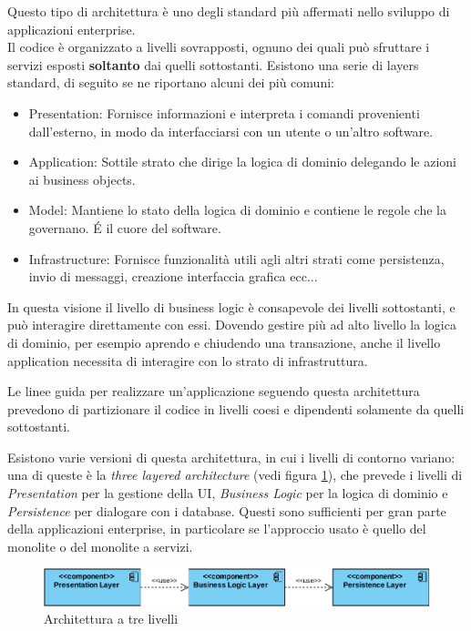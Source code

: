 Questo tipo di architettura è uno degli standard più affermati nello sviluppo di applicazioni enterprise.\\
Il codice è organizzato a livelli sovrapposti, ognuno dei quali può sfruttare i servizi esposti \textbf{soltanto} dai quelli sottostanti.
Esistono una serie di layers standard, di seguito se ne riportano alcuni dei più comuni\cite{ddd}:
\begin{itemize}
	\item Presentation: Fornisce informazioni e interpreta i comandi provenienti dall'esterno, in modo da interfacciarsi con un utente o un'altro software.
	\item Application: Sottile strato che dirige la logica di dominio delegando le azioni ai business objects.
	\item Model: Mantiene lo stato della logica di dominio e contiene le regole che la governano. \'E il cuore del software.
	\item Infrastructure: Fornisce funzionalità utili agli altri strati come persistenza, invio di messaggi, creazione interfaccia grafica ecc...
\end{itemize}
In questa visione il livello di business logic è consapevole dei livelli sottostanti, e può interagire direttamente con essi.
Dovendo gestire più ad alto livello la logica di dominio, per esempio aprendo e chiudendo una transazione, anche il livello application necessita di interagire con lo strato di infrastruttura.

Le linee guida per realizzare un'applicazione seguendo questa architettura prevedono di partizionare il codice in livelli coesi e dipendenti solamente da quelli sottostanti.

Esistono varie versioni di questa architettura, in cui i livelli di contorno variano: una di queste è la \textit{three layered architecture} (vedi figura \ref{fig:layered-architecture}), che prevede i livelli di \textit{Presentation} per la gestione della UI, \textit{Business Logic} per la logica di dominio e \textit{Persistence} per dialogare con i database.
Questi sono sufficienti per gran parte della applicazioni enterprise, in particolare se l'approccio usato è quello del monolite o del monolite a servizi.\\

\begin{figure}[h]
	\centering
	\includegraphics[width=\textwidth]{img/layered-architecture}
	\caption{Architettura a tre livelli}
	\label{fig:layered-architecture}
\end{figure}

